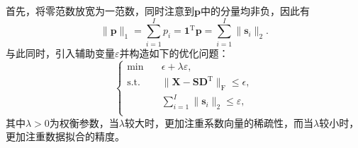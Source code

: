 首先，将零范数放宽为一范数，同时注意到\( \bm{p} \)中的分量均非负，因此有
\[
    \|\bm{p}\|_1 = \sum_{i=1}^I p_i = \bm{1}^{\mathrm{T}} \bm{p} = \sum_{i=1}^I \|\bm{s}_i\|_2.
\]
与此同时，引入辅助变量\( \varepsilon \)并构造如下的优化问题：
\[
    \begin{cases}
        \min \quad        & \epsilon + \lambda \varepsilon,                                                 \\
        \text{s.t.} \quad & \|\mathbf{X} - \mathbf{S} \mathbf{D}^{\mathrm{T}}\|_{\mathrm{F}} \leq \epsilon, \\
                          & \sum_{i=1}^I \|\bm{s}_i\|_2 \leq \varepsilon,                                   \\
    \end{cases}
\]
其中\( \lambda > 0 \)为权衡参数，当\( \lambda \)较大时，更加注重系数向量的稀疏性，而当\( \lambda \)较小时，更加注重数据拟合的精度。


